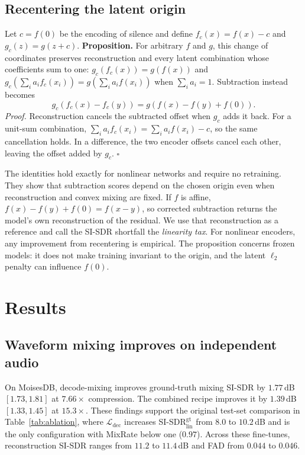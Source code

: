 \documentclass[conference]{IEEEtran}
\newcommand{\tabref}[1]{Table~\ref{#1}}
\newcommand{\Ldec}{\mathcal{L}_\mathrm{dec}}
\begin{document}
\subsection{Recentering the latent origin}\label{sec:prop}
Let $c=f(0)$ be the encoding of silence and define
$f_c(x)=f(x)-c$ and $g_c(z)=g(z+c)$.
\textbf{Proposition.} For arbitrary $f$ and $g$, this change of coordinates
preserves reconstruction and every latent combination whose coefficients
sum to one:
$g_c(f_c(x))=g(f(x))$ and
$g_c(\sum_i a_i f_c(x_i))=g(\sum_i a_i f(x_i))$ when $\sum_i a_i=1$.
Subtraction instead becomes
\begin{equation}
  g_c\!\left(f_c(x)-f_c(y)\right)
  =g\!\left(f(x)-f(y)+f(0)\right).
  \label{eq:sub}
\end{equation}
\emph{Proof.} Reconstruction cancels the subtracted offset when $g_c$ adds
it back. For a unit-sum combination,
$\sum_i a_i f_c(x_i)=\sum_i a_i f(x_i)-c$, so the same cancellation holds.
In a difference, the two encoder offsets cancel each other, leaving the
offset added by $g_c$. $\square$

The identities hold exactly for nonlinear networks and require no
retraining. They show that subtraction scores depend on the chosen origin
even when reconstruction and convex mixing are fixed. If $f$ is affine,
$f(x)-f(y)+f(0)=f(x-y)$, so corrected subtraction returns the model's own
reconstruction of the residual. We use that reconstruction as a reference
and call the SI-SDR shortfall the \emph{linearity tax}. For nonlinear
encoders, any improvement from recentering is empirical. The proposition
concerns frozen models: it does not make training invariant to the origin,
and the latent $\ell_2$ penalty can influence $f(0)$.

\section{Results}\label{sec:results}

\subsection{Waveform mixing improves on independent audio}\label{sec:mixing}
On MoisesDB, decode-mixing improves ground-truth mixing SI-SDR by
$1.77$\,dB $[1.73,1.81]$ at $7.66\times$ compression. The combined recipe
improves it by $1.39$\,dB $[1.33,1.45]$ at $15.3\times$. These findings
support the original test-set comparison in \tabref{tab:ablation}, where
$\Ldec$ increases SI-SDR$_\mathrm{lin}^\mathrm{gt}$ from $8.0$ to
$10.2$\,dB and is the only configuration with MixRate below one ($0.97$).
Across these fine-tunes, reconstruction SI-SDR ranges from $11.2$ to
$11.4$\,dB and FAD from $0.044$ to $0.046$.
\end{document}
